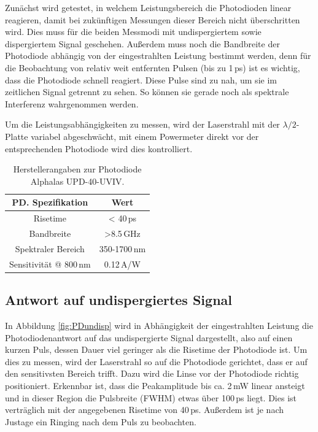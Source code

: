\documentclass[bachelor,       %
               twoside,        %
               BCOR10mm,       %
               english,ngerman, %
               ]{GAUBM}
\begin{document}
Zunächst wird getestet, in welchem Leistungsbereich die Photodioden linear reagieren, damit bei zukünftigen Messungen dieser Bereich nicht überschritten wird.
Dies muss für die beiden Messmodi mit undispergiertem sowie dispergiertem Signal geschehen.
Außerdem muss noch die Bandbreite der Photodiode abhängig von der eingestrahlten Leistung bestimmt werden, denn für die Beobachtung von relativ weit entfernten Pulsen (bis zu 1\,ps) ist es wichtig, dass die Photodiode schnell reagiert.
Diese Pulse sind zu nah, um sie im zeitlichen Signal getrennt zu sehen.
So können sie gerade noch als spektrale Interferenz wahrgenommen werden.

Um die Leistungsabhängigkeiten zu messen, wird der Laserstrahl mit der $\lambda/2$-Platte variabel abgeschwächt, mit einem Powermeter direkt vor der entsprechenden Photodiode wird dies kontrolliert.

\begin{table}[!htb]
	\centering
	\begin{tabular}{|c|c|}
		\hline
		PD. Spezifikation & Wert \\		
		\hline
		Risetime & < 40\,ps \\
		Bandbreite & >8.5\,GHz \\
		Spektraler Bereich & 350-1700\,nm \\
		Sensitivität @ 800\,nm & 0.12\,A/W\\
		\hline	
	\end{tabular}
	\caption{Herstellerangaben zur Photodiode Alphalas UPD-40-UVIV.}
	\label{tab:PD}
\end{table}

\subsection{Antwort auf undispergiertes Signal}
In Abbildung \ref{fig:PDundisp} wird in Abhängigkeit der eingestrahlten Leistung die Photodiodenantwort auf das undispergierte Signal dargestellt, also auf einen kurzen Puls, dessen Dauer viel geringer als die Risetime der Photodiode ist.
Um dies zu messen, wird der Laserstrahl so auf die Photodiode gerichtet, dass er auf den sensitivsten Bereich trifft.
Dazu wird die Linse vor der Photodiode richtig positioniert.
Erkennbar ist, dass die Peakamplitude bis ca. 2\,mW linear ansteigt und in dieser Region die Pulsbreite (FWHM) etwas über 100\,ps liegt.
Dies ist verträglich mit der angegebenen Risetime von 40\,ps.
Außerdem ist je nach Justage ein Ringing nach dem Puls zu beobachten.
\end{document}
